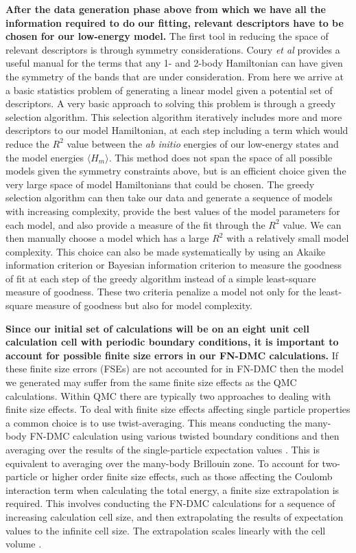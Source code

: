 \documentclass{article}
\begin{document}
\textbf{After the data generation phase above from which we have all the information required to do our fitting, relevant descriptors have to be chosen for our low-energy model. }
The first tool in reducing the space of relevant descriptors is through symmetry considerations. Coury \textit{et al} \cite{Coury2016} provides a useful manual for the terms that any 1- and 2-body Hamiltonian can have given the symmetry of the bands that are under consideration. 
From here we arrive at a basic statistics problem of generating a linear model given a potential set of descriptors. 
A very basic approach to solving this problem is through a greedy selection algorithm. 
This selection algorithm iteratively includes more and more descriptors to our model Hamiltonian, at each step including a term which would reduce the $R^2$ value between the \textit{ab initio} energies of our low-energy states and the model energies $\langle H_m \rangle$. 
This method does not span the space of all possible models given the symmetry constraints above, but is an efficient choice given the very large space of model Hamiltonians that could be chosen. 
The greedy selection algorithm can then take our data and generate a sequence of models with increasing complexity, provide the best values of the model parameters for each model, and also provide a measure of the fit through the $R^2$ value. 
We can then manually choose a model which has a large $R^2$ with a relatively small model complexity. 
This choice can also be made systematically by using an Akaike information criterion \cite{ref591} or Bayesian information criterion \cite{schwarz1978} to measure the goodness of fit at each step of the greedy algorithm instead of a simple least-square measure of goodness. 
These two criteria penalize a model not only for the least-square measure of goodness but also for model complexity.

\textbf{Since our initial set of calculations will be on an eight unit cell calculation cell with periodic boundary conditions, it is important to account for possible finite size errors in our FN-DMC calculations. }
If these finite size errors (FSEs) are not accounted for in FN-DMC then the model we generated may suffer from the same finite size effects as the QMC calculations. 
Within QMC there are typically two approaches to dealing with finite size effects. 
To deal with finite size effects affecting single particle properties a common choice is to use twist-averaging. 
This means conducting the many-body FN-DMC calculation using various twisted boundary conditions and then averaging over the results of the single-particle expectation values \cite{Lin2001, PhysRevB.78.125106}.
This is equivalent to averaging over the many-body Brillouin zone. 
To account for two-particle or higher order finite size effects, such as those affecting the Coulomb interaction term when calculating the total energy, a finite size extrapolation is required. 
This involves conducting the FN-DMC calculations for a sequence of increasing calculation cell size, and then extrapolating the results of expectation values to the infinite cell size. 
The extrapolation scales linearly with the cell volume \cite{PhysRevB.78.125106}.
\end{document}
